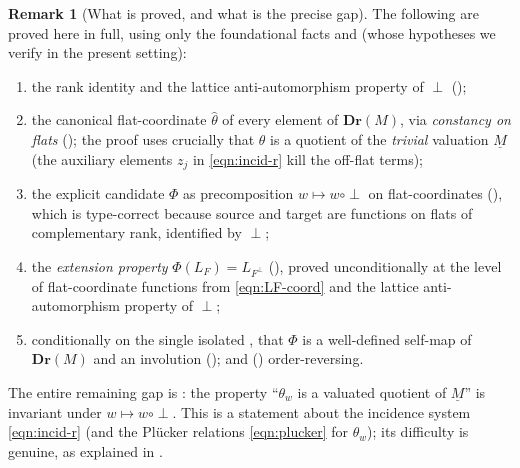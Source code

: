 \documentclass{article}
\theoremstyle{definition}
\newtheorem{remark}[theorem]{Remark}
\newcommand{\Dr}{\mathbf{Dr}}
\begin{document}
\begin{remark}[What is proved, and what is the precise gap]\label{rmk:honest}
The following are proved here in full, using only the foundational facts  and
 (whose hypotheses we verify in the present setting):
\begin{enumerate}
\item the rank identity and the lattice anti-automorphism property of $\perp$ ();
\item the canonical flat-coordinate $\widehat\theta$ of every element of $\Dr(M)$, via
\emph{constancy on flats} (); the proof uses crucially that $\theta$ is a
quotient of the \emph{trivial} valuation $\underline M$ (the auxiliary elements $z_j$ in
\eqref{eqn:incid-r} kill the off-flat terms);
\item the explicit candidate $\Phi$ as precomposition $w\mapsto w\circ\perp$ on flat-coordinates
(), which is type-correct because source and target are functions on flats of
complementary rank, identified by $\perp$;
\item the \emph{extension property} $\Phi(L_F)=L_{F^{\perp}}$ (), proved
unconditionally at the level of flat-coordinate functions from \eqref{eqn:LF-coord} and the lattice
anti-automorphism property of $\perp$;
\item conditionally on the single isolated , that $\Phi$ is a well-defined
self-map of $\Dr(M)$ and an involution (); and () order-reversing.
\end{enumerate}
The entire remaining gap is : the property ``$\theta_w$ is a valuated
quotient of $\underline M$'' is invariant under $w\mapsto w\circ\perp$. This is a statement about the
incidence system \eqref{eqn:incid-r} (and the Pl\"ucker relations \eqref{eqn:plucker} for $\theta_w$);
its difficulty is genuine, as explained in .
\end{remark}
\end{document}
